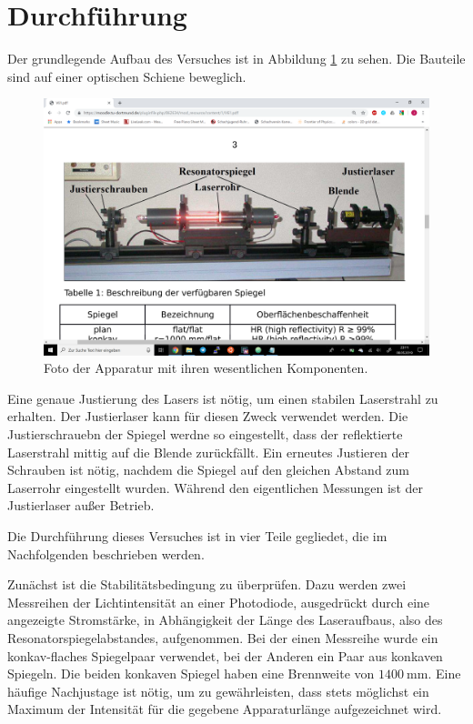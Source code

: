 \section{Durchführung}
\label{sec:Durchführung}

Der grundlegende Aufbau des Versuches ist in Abbildung \ref{fig:aufbau} zu sehen. Die Bauteile sind auf einer optischen Schiene beweglich.

\begin{figure}
  \centering
  \includegraphics[width=\textwidth]{data/aufbau.png}
  \caption{Foto der Apparatur mit ihren wesentlichen Komponenten.}
  \label{fig:aufbau}
\end{figure}

Eine genaue Justierung des Lasers ist nötig, um einen stabilen Laserstrahl zu erhalten. Der Justierlaser kann für diesen Zweck verwendet werden. Die Justierschrauebn der Spiegel werdne so eingestellt, dass der reflektierte Laserstrahl mittig auf die Blende zurückfällt. Ein erneutes Justieren der Schrauben ist nötig, nachdem die Spiegel auf den gleichen Abstand zum Laserrohr eingestellt wurden. Während den eigentlichen Messungen ist der Justierlaser außer Betrieb.

Die Durchführung dieses Versuches ist in vier Teile gegliedet, die im Nachfolgenden beschrieben werden.

Zunächst ist die Stabilitätsbedingung zu überprüfen. Dazu werden zwei Messreihen der Lichtintensität an einer Photodiode, ausgedrückt durch eine angezeigte Stromstärke, in Abhängigkeit der Länge des Laseraufbaus, also des Resonatorspiegelabstandes, aufgenommen. Bei der einen Messreihe wurde ein konkav-flaches Spiegelpaar verwendet, bei der Anderen ein Paar aus konkaven Spiegeln. Die beiden konkaven Spiegel haben eine Brennweite von $\SI{1400}{\milli\meter}$. Eine häufige Nachjustage ist nötig, um zu gewährleisten, dass stets möglichst ein Maximum der Intensität für die gegebene Apparaturlänge aufgezeichnet wird.

